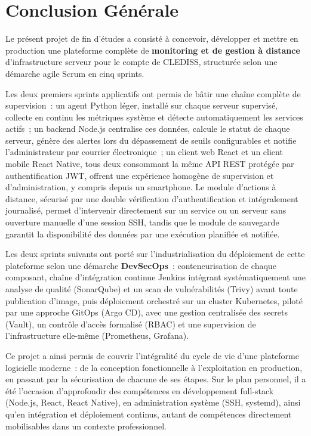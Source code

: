 \chapter*{Conclusion Générale}

Le présent projet de fin d'études a consisté à concevoir, développer et mettre en production une plateforme complète de \textbf{monitoring et de gestion à distance} d'infrastructure serveur pour le compte de CLEDISS, structurée selon une démarche agile Scrum en cinq sprints.

Les deux premiers sprints applicatifs ont permis de bâtir une chaîne complète de supervision~: un agent Python léger, installé sur chaque serveur supervisé, collecte en continu les métriques système et détecte automatiquement les services actifs~; un backend Node.js centralise ces données, calcule le statut de chaque serveur, génère des alertes lors du dépassement de seuils configurables et notifie l'administrateur par courrier électronique~; un client web React et un client mobile React Native, tous deux consommant la même API REST protégée par authentification JWT, offrent une expérience homogène de supervision et d'administration, y compris depuis un smartphone. Le module d'actions à distance, sécurisé par une double vérification d'authentification et intégralement journalisé, permet d'intervenir directement sur un service ou un serveur sans ouverture manuelle d'une session SSH, tandis que le module de sauvegarde garantit la disponibilité des données par une exécution planifiée et notifiée.

Les deux sprints suivants ont porté sur l'industrialisation du déploiement de cette plateforme selon une démarche \textbf{DevSecOps}~: conteneurisation de chaque composant, chaîne d'intégration continue Jenkins intégrant systématiquement une analyse de qualité (SonarQube) et un scan de vulnérabilités (Trivy) avant toute publication d'image, puis déploiement orchestré sur un cluster Kubernetes, piloté par une approche GitOps (Argo CD), avec une gestion centralisée des secrets (Vault), un contrôle d'accès formalisé (RBAC) et une supervision de l'infrastructure elle-même (Prometheus, Grafana).

Ce projet a ainsi permis de couvrir l'intégralité du cycle de vie d'une plateforme logicielle moderne~: de la conception fonctionnelle à l'exploitation en production, en passant par la sécurisation de chacune de ses étapes. Sur le plan personnel, il a été l'occasion d'approfondir des compétences en développement full-stack (Node.js, React, React Native), en administration système (SSH, systemd), ainsi qu'en intégration et déploiement continus, autant de compétences directement mobilisables dans un contexte professionnel.

